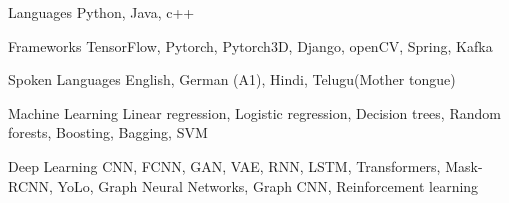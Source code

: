 
\begin{cvskills}
  \cvskill
    {Languages} %
    {Python, Java, c++} %

  \cvskill
    {Frameworks} %
    {TensorFlow, Pytorch, Pytorch3D, Django, openCV, Spring, Kafka} %
    
	\cvskill
	{Spoken Languages} %
	{English, German (A1), Hindi, Telugu(Mother tongue)} %
	
	\cvskill
	{Machine Learning} %
	{Linear regression, Logistic regression, Decision trees, Random forests, Boosting, Bagging, SVM} %
	
	\cvskill
	{Deep Learning} %
	{CNN, FCNN, GAN, VAE, RNN, LSTM, Transformers, Mask-RCNN, YoLo, Graph Neural Networks, Graph CNN, Reinforcement learning} %
\end{cvskills}
